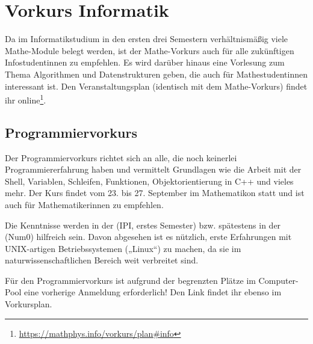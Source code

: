 \section{Vorkurs Informatik}
Da im Informatikstudium in den ersten drei Semestern verhältnismäßig viele Mathe-Module belegt werden, ist der Mathe-Vorkurs auch für alle zukünftigen Infostudentinnen zu empfehlen. Es wird darüber hinaus eine Vorlesung zum Thema Algorithmen und Datenstrukturen geben, die auch für Mathestudentinnen interessant ist. Den Veranstaltungsplan (identisch mit dem Mathe-Vorkurs) findet ihr online\footnote{\label{info-vorkursplan}\url{https://mathphys.info/vorkurs/plan\#info}}.

\subsection{Programmiervorkurs}
Der Programmiervorkurs richtet sich an alle, die noch keinerlei Programmiererfahrung haben und vermittelt Grundlagen wie die Arbeit mit der Shell, Variablen, Schleifen, Funktionen, Objektorientierung in C++ und vieles mehr. Der Kurs findet vom 23. bis 27. September im \gls{Mathematikon} statt und ist auch für Mathematikerinnen zu empfehlen.

Die Kenntnisse werden in der  (\gls{IPI}, erstes Semester) bzw. spätestens in der  (\gls{Num0}) hilfreich sein. Davon abgesehen ist es nützlich, erste Erfahrungen mit UNIX-artigen Betriebssystemen („Linux“) zu machen, da sie im naturwissenschaftlichen Bereich weit verbreitet sind.

Für den Programmiervorkurs ist aufgrund der begrenzten Plätze im Computer-Pool eine vorherige Anmeldung erforderlich! Den Link findet ihr ebenso im Vorkursplan.
